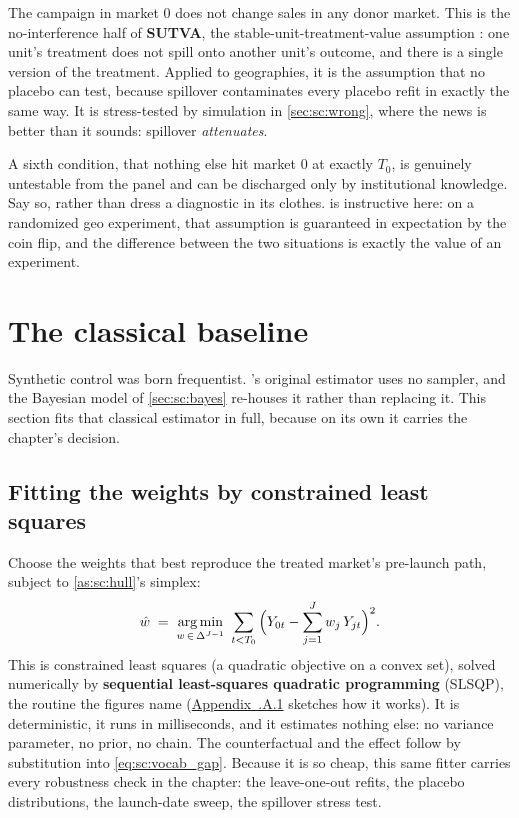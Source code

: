 \begin{assumption}[No interference]\label{as:sc:sutva}
The campaign in market $0$ does not change sales in any donor market. This is the no-interference
half of \textbf{SUTVA}, the stable-unit-treatment-value assumption \citep{imbens2015}: one unit's
treatment does not spill onto another unit's outcome, and there is a single version of the treatment.
Applied to geographies, it is the assumption that no placebo can test,
because spillover contaminates every placebo refit in exactly the same way. It is stress-tested
by simulation in \cref{sec:sc:wrong}, where the news is better than it sounds: spillover
\emph{attenuates}.
\end{assumption}

\begin{remark}
A sixth condition, that nothing else hit market $0$ at exactly $T_0$, is genuinely
untestable from the panel and can be discharged only by institutional knowledge. Say so, rather
than dress a diagnostic in its clothes.  is instructive here: on a randomized
geo experiment, that assumption is guaranteed in expectation by the coin flip, and the difference
between the two situations is exactly the value of an experiment.
\end{remark}

\section{The classical baseline}
\label{sec:sc:classical}

Synthetic control was born frequentist. \citeauthor{abadie2003}'s original estimator uses no
sampler, and the Bayesian model of \cref{sec:sc:bayes} re-houses it rather than replacing it. This
section fits that classical estimator in full, because on its own it carries the chapter's decision.

\subsection*{Fitting the weights by constrained least squares}

Choose the weights that best reproduce the treated market's pre-launch path, subject to
\cref{as:sc:hull}'s simplex:
%
\begin{equation}
  \hat w \;=\; \operatorname*{arg\,min}_{w \,\in\, \Delta^{J-1}}\ \sum_{t < T_0}
    \Big( Y_{0t} - \sum_{j=1}^{J} w_j\, Y_{jt} \Big)^{2}.
  \label{eq:sc:slsqp}
\end{equation}
%
This is constrained least squares (a quadratic objective on a convex set), solved numerically by
\textbf{sequential least-squares quadratic programming} (SLSQP), the routine the figures name
(\hyperref[app:sc:slsqp]{Appendix~\thechapter.A.1} sketches how it works). It is
deterministic, it runs in milliseconds, and it estimates nothing else: no variance parameter, no
prior, no chain. The
counterfactual and the effect follow by substitution into \cref{eq:sc:vocab_gap}. Because it is so
cheap, this same fitter carries every robustness check in the chapter: the leave-one-out
refits, the placebo distributions, the launch-date sweep, the spillover stress test.

